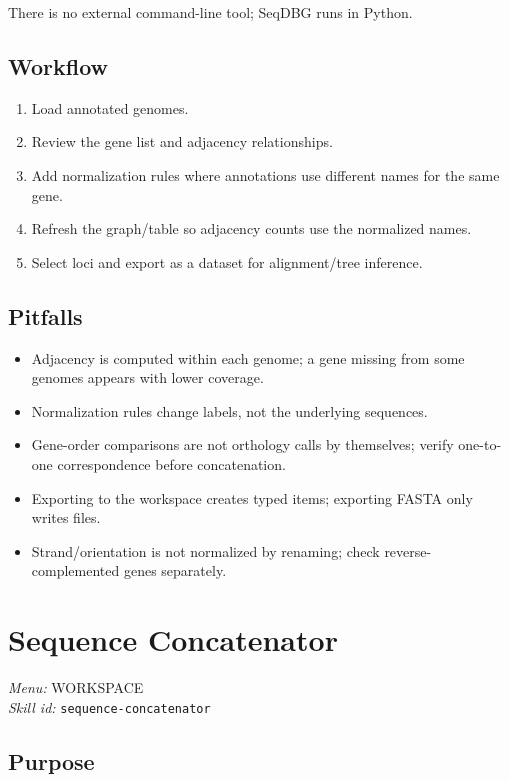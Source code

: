 \documentclass[11pt]{report}
\begin{document}
There is no external command-line tool; SeqDBG runs in Python.

\subsection{Workflow}

\begin{enumerate}
  \item Load annotated genomes.
  \item Review the gene list and adjacency relationships.
  \item Add normalization rules where annotations use different names for the same gene.
  \item Refresh the graph/table so adjacency counts use the normalized names.
  \item Select loci and export as a dataset for alignment/tree inference.
\end{enumerate}

\subsection{Pitfalls}

\begin{itemize}
  \item Adjacency is computed within each genome; a gene missing from some genomes appears with lower coverage.
  \item Normalization rules change labels, not the underlying sequences.
  \item Gene-order comparisons are not orthology calls by themselves; verify one-to-one correspondence before concatenation.
  \item Exporting to the workspace creates typed items; exporting FASTA only writes files.
  \item Strand/orientation is not normalized by renaming; check reverse-complemented genes separately.
\end{itemize}


\section{Sequence Concatenator}
\noindent\textit{Menu:} WORKSPACE\\
\noindent\textit{Skill id:} \texttt{sequence-concatenator}

\subsection{Purpose}
\end{document}
